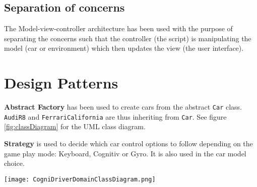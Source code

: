 \subsection{Separation of concerns}
The Model-view-controller architecture has been used with the purpose of separating the concerns such that the controller (the script) is manipulating the model (car or environment) which then updates the view (the user interface).

\section{Design Patterns}

\textbf{Abstract Factory} has been used to create cars from the abstract \texttt{Car} class. \texttt{AudiR8} and \texttt{FerrariCalifornia} are thus inheriting from \texttt{Car}. See figure \ref{fig:classDiagram} for the UML class diagram.

\textbf{Strategy} is used to decide which car control options to follow depending on the game play mode: Keyboard, Cognitiv or Gyro. It is also used in the car model choice.

\pagestyle{plain}
\begin{sidewaysfigure}
  \centering
  \texttt{[image: CogniDriverDomainClassDiagram.png]}
  \caption{Domain class diagram for CogniDriver. The instance variables have been omitted for simplification.}
    \label{fig:classDiagram}           
\end{sidewaysfigure}

